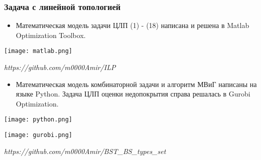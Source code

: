 \begin{frame}
    \frametitle{Задача с линейной топологией}
    \fontsize{8pt}{7.2}\selectfont
    \begin{itemize}
        \item Математическая модель задачи ЦЛП (1) - (18) написана и решена в Matlab Optimization Toolbox.
    \end{itemize}

    \begin{minipage}[c]{0.4\linewidth}
        \fontsize{8pt}{7.2}\selectfont
        \bigskip
        \texttt{[image: matlab.png]}

    \end{minipage}
    \textit{https://github.com/m0000Amir/ILP}
    \bigskip
    \bigskip
    
    \begin{itemize}
        \item Математическая модель комбинаторной задачи и алгоритм МВиГ написаны на языке Python. Задача ЦЛП оценки недопокрытия справа решалась в Gurobi Optimization.
    \end{itemize}





    \begin{minipage}[c]{0.45\linewidth}
        \fontsize{8pt}{7.2}\selectfont
        \bigskip
        \texttt{[image: python.png]}
        
    \end{minipage}
    \begin{minipage}[c]{0.45\linewidth}
        \texttt{[image: gurobi.png]}

    \end{minipage}

    \bigskip
    \textit{https://github.com/m0000Amir/BST\_BS\_types\_set}


    
\end{frame}

